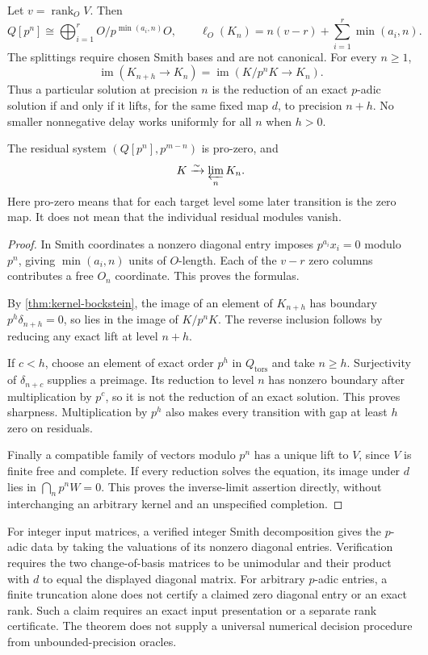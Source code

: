 \begin{theorem}\label{thm:precision-window}
Let $v=\operatorname{rank}_O V$. Then
\[
 Q[p^n]\cong\bigoplus_{i=1}^r O/p^{\min(a_i,n)}O,
 \qquad
 \ell_O(K_n)=n(v-r)+\sum_{i=1}^r\min(a_i,n).
\]
The splittings require chosen Smith bases and are not canonical. For every $n\geq1$,
\[
 \boxed{\operatorname{im}(K_{n+h}\longrightarrow K_n)
       =\operatorname{im}(K/p^nK\longrightarrow K_n).}
\]
Thus a particular solution at precision $n$ is the reduction of an exact $p$-adic solution if and only if it lifts, for the same fixed map $d$, to precision $n+h$. No smaller nonnegative delay works uniformly for all $n$ when $h>0$.

The residual system $(Q[p^n],p^{m-n})$ is pro-zero, and
\[
 K\xrightarrow{\sim}\varprojlim_n K_n.
\]
Here pro-zero means that for each target level some later transition is the zero map. It does not mean that the individual residual modules vanish.
\end{theorem}
\begin{proof}
In Smith coordinates a nonzero diagonal entry imposes $p^{a_i}x_i=0$ modulo $p^n$, giving $\min(a_i,n)$ units of $O$-length. Each of the $v-r$ zero columns contributes a free $O_n$ coordinate. This proves the formulas.

By \cref{thm:kernel-bockstein}, the image of an element of $K_{n+h}$ has boundary $p^h\delta_{n+h}=0$, so lies in the image of $K/p^nK$. The reverse inclusion follows by reducing any exact lift at level $n+h$.

If $c<h$, choose an element of exact order $p^h$ in $Q_{\mathrm{tors}}$ and take $n\geq h$. Surjectivity of $\delta_{n+c}$ supplies a preimage. Its reduction to level $n$ has nonzero boundary after multiplication by $p^c$, so it is not the reduction of an exact solution. This proves sharpness. Multiplication by $p^h$ also makes every transition with gap at least $h$ zero on residuals.

Finally a compatible family of vectors modulo $p^n$ has a unique lift to $V$, since $V$ is finite free and complete. If every reduction solves the equation, its image under $d$ lies in $\bigcap_n p^nW=0$. This proves the inverse-limit assertion directly, without interchanging an arbitrary kernel and an unspecified completion.
\end{proof}

\begin{remark}
For integer input matrices, a verified integer Smith decomposition gives the $p$-adic data by taking the valuations of its nonzero diagonal entries. Verification requires the two change-of-basis matrices to be unimodular and their product with $d$ to equal the displayed diagonal matrix. For arbitrary $p$-adic entries, a finite truncation alone does not certify a claimed zero diagonal entry or an exact rank. Such a claim requires an exact input presentation or a separate rank certificate. The theorem does not supply a universal numerical decision procedure from unbounded-precision oracles.
\end{remark}

